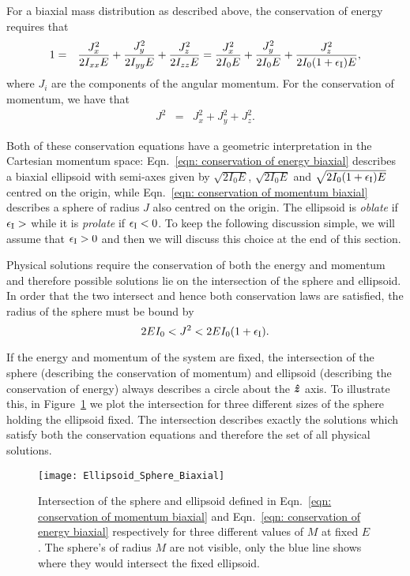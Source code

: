 \documentclass[../full_thesis/full_thesis.tex]{subfiles}
\begin{document}
For a biaxial mass distribution as described above, the conservation of energy
requires that
\begin{eqnarray}
1 & = & \frac{J_{x}^{2}}{2I_{xx}E}+\frac{J_{y}^{2}}{2I_{yy}E}+\frac{J_{z}^{2}}{2I_{zz}E}
=\frac{J_{x}^{2}}{2I_{0}E}+\frac{J_{y}^{2}}{2I_{0}E}+\frac{J_{z}^{2}}{2I_{0}(1+\epsilon_{\mathrm{I}})E},
\label{eqn: conservation of energy biaxial}
\end{eqnarray}
where $J_i$ are the components of the angular momentum. For the conservation of
momentum, we have that
\begin{eqnarray}
J^{2} & = & J_{x}^{2}+J_{y}^{2}+J_{z}^{2}.
\label{eqn: conservation of momentum biaxial}
\end{eqnarray}

Both of these conservation equations have a geometric interpretation in the
Cartesian momentum space: Eqn.~\eqref{eqn: conservation of energy biaxial}
describes a biaxial ellipsoid with semi-axes given by $\sqrt{2I_{0}E}$,
$\sqrt{2I_{0}E}$ and $\sqrt{2I_{0}(1+\epsilon_{\mathrm{I}})E}$ centred on the origin,
while Eqn.~\eqref{eqn: conservation of momentum biaxial} describes a sphere of
radius $J$ also centred on the origin. The ellipsoid is \emph{oblate} if $\epsilon_{\mathrm{I}}
> $ while it is \emph{prolate} if $\epsilon_{\mathrm{I}} < 0$. To keep the following discussion
simple, we will assume that $\epsilon_{\mathrm{I}} > 0$ and then we will discuss this choice at
the end of this section.

Physical solutions require the conservation of both
the energy and momentum and therefore possible solutions lie on the intersection
of the sphere and ellipsoid. In order that the two intersect and hence both
conservation laws are satisfied, the radius of the sphere must be bound by
\begin{equation}
2EI_{0}<J^{2}<2EI_{0}(1+\epsilon_{\mathrm{I}}).
\label{eqn: orderings}
\end{equation}

If the energy and momentum of the system are fixed, the intersection of the
sphere (describing the conservation of momentum) and ellipsoid (describing the
conservation of energy) always describes a circle about the $\boldsymbol{\hat{z}}$ axis. To illustrate
this, in Figure~\ref{fig: plot sphere ellipse biaxial} we plot the intersection
for three different sizes of the sphere holding the ellipsoid fixed. The
intersection describes exactly the solutions which satisfy both the conservation
equations and therefore the set of all physical solutions.
\begin{figure}[ht]
\centering
\texttt{[image: Ellipsoid\_Sphere\_Biaxial]}
\caption{Intersection of the sphere and ellipsoid defined in Eqn.~\eqref{eqn:
conservation of momentum biaxial} and Eqn.~\eqref{eqn: conservation of energy
biaxial} respectively for three different values of $M$ at
fixed $E$. The sphere's of radius $M$ are not visible, only the blue line shows
where they would intersect the fixed ellipsoid.}
\label{fig: plot sphere ellipse biaxial}
\end{figure}
\end{document}
